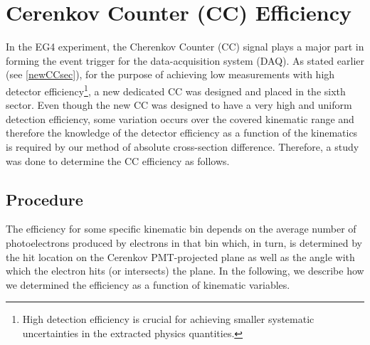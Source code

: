 \hspace{0.5cm}





\section{Cerenkov Counter (CC) Efficiency}
\label{secCCineff}
In the EG4 experiment, the Cherenkov Counter (CC) signal plays a major part in forming the event trigger for %
the data-acquisition system (DAQ). As stated earlier (see \ref{newCCsec}), for the purpose of achieving low \qsqs measurements with high detector efficiency\footnote{High detection efficiency is crucial for achieving smaller systematic uncertainties in the extracted physics quantities.}, a new %
dedicated CC was designed and placed in the sixth sector. Even though the new CC was designed to have a very high and uniform detection efficiency, some variation occurs over the covered kinematic range and therefore the knowledge of the detector efficiency as a function of the kinematics is required by our method of absolute cross-section difference. %
Therefore, a study was done to determine the CC efficiency as follows. 



\subsection{Procedure}

The efficiency for some specific kinematic bin depends on the average number of photoelectrons %
produced by electrons in that bin which, in turn, is determined by the hit location on the Cerenkov PMT-projected plane %
as well as the angle with which the %
electron hits (or intersects) the plane. In the following, we describe how we determined the efficiency as a function of kinematic variables. %


